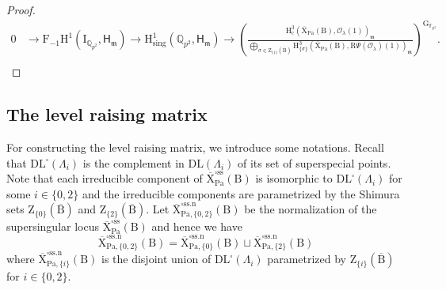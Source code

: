 \documentclass[10pt]{amsart}
\numberwithin{equation}{section}
\theoremstyle{definition}
\def\Pa{\mathrm{Pa}}
\def\calO{\mathcal{O}}
\def\fracm{\mathfrak{m}}
\def\FF{\mathbb{F}}
\def\QQ{\mathbb{Q}}
\def\rmB{\mathrm{B}}
\def\rmG{\mathrm{G}}
\def\rmH{\mathrm{H}}
\def\rmR{\mathrm{R}}
\def\rmX{\mathrm{X}}
\def\rmZ{\mathrm{Z}}
\begin{document}
\begin{proof}
\begin{equation*}
\begin{aligned}
0&\rightarrow \mathrm{F}_{-1}\mathrm{H}^{1}(\mathrm{I}_{\QQ_{p^{2}}}, \mathsf{H}_{\fracm})\rightarrow \rmH^{1}_{\mathrm{sing}}(\QQ_{p^{2}}, \mathsf{H}_{\fracm}) \rightarrow (\frac{\rmH^{3}_{\mathrm{c}}(\overline{\rmX}_{\Pa}(\rmB), \calO_{\lambda}(1))_{\fracm}}{\bigoplus\limits_{\sigma\in \rmZ_{\{1\}}(\overline{\rmB})}\rmH^{3}_{\{\sigma\}}(\overline{\rmX}_{\Pa}(\rmB), \rmR\Psi(\calO_{\lambda})(1))_{\fracm}})^{\rmG_{\FF_{p^{2}}}}.\\
\end{aligned}
\end{equation*}
\end{proof}
\subsection{The level raising matrix}
For constructing the level raising matrix, we introduce some notations. Recall that $\mathrm{DL}^{\square}(\Lambda_{i})$ is the complement in $\mathrm{DL}(\Lambda_{i})$ of its set of superspecial points. Note that each irreducible component of  $\overline{\rmX}^{\square\mathrm{ss}}_{\Pa}(\rmB)$ is isomorphic to $\mathrm{DL}^{\square}(\Lambda_{i})$ for some $i\in\{0,2\}$ and the irreducible components are parametrized by the Shimura sets $\rmZ_{\{0\}}(\overline{\rmB})$ and $\rmZ_{\{2\}}(\overline{\rmB})$. Let $\overline{\rmX}^{\square\mathrm{ss.n}}_{\Pa, \{0,2\}}(\rmB)$ be the normalization of the supersingular locus $\overline{\rmX}^{\square\mathrm{ss}}_{\Pa}(\rmB)$ and hence we have 
 \begin{equation*}
 \overline{\rmX}^{\square\mathrm{ss.n}}_{\Pa, \{0,2\}}(\rmB)=\overline{\rmX}^{\square\mathrm{ss.n}}_{\Pa, \{0\}}(\rmB)\sqcup \overline{\rmX}^{\square\mathrm{ss.n}}_{\Pa, \{2\}}(\rmB)  
 \end{equation*}
where $ \overline{\rmX}^{\square\mathrm{ss.n}}_{\Pa, \{i\}}(\rmB)$ is the disjoint union of $\mathrm{DL}^{\square}(\Lambda_{i})$ parametrized by $\rmZ_{\{i\}}(\overline{\rmB})$ for $i\in\{0,2\}$.  
\end{document}
